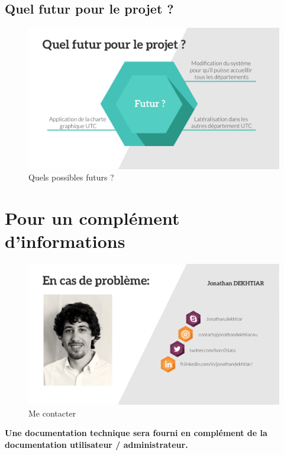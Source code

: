 \documentclass[a4paper,titlepage]{scrartcl}
\begin{document}
\subsection{Quel futur pour le projet ?}

\begin{figure}[H]
	\vspace{-3mm}
	\begin{center}
		\includegraphics[scale=0.33]{Images/futur.png}
		\caption{Quels possibles futurs ?}
		\vspace{-1.5cm}
	\end{center}
\end{figure}

\clearpage


\section{Pour un complément d'informations}

\begin{figure}[H]
	\vspace{-3mm}
	\begin{center}
		\includegraphics[scale=0.33]{Images/john.png}
		\caption{Me contacter}
	\end{center}
\end{figure}

\Large

\begin{center}
\textbf{Une documentation technique sera fourni en complément de la documentation utilisateur / administrateur.}
\end{center}
\end{document}
